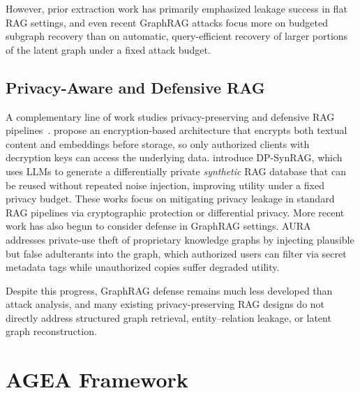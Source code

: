 However, prior extraction work has primarily emphasized leakage success in flat RAG settings, and even recent GraphRAG attacks focus more on budgeted subgraph recovery than on automatic, query-efficient recovery of larger portions of the latent graph under a fixed attack budget.




\subsection{Privacy-Aware and Defensive RAG}
\label{privacy_appendix}
A complementary line of work studies privacy-preserving and defensive RAG pipelines~\cite{al2026systemic}. \citealp{zhou2025privacy} propose an encryption-based architecture that encrypts both textual content and embeddings before storage, so only authorized clients with decryption keys can access the underlying data. 
\citealp{mori2025differentially} introduce {DP-SynRAG}, which uses LLMs to generate a differentially private \emph{synthetic} RAG database that can be reused without repeated noise injection, improving utility under a fixed privacy budget. 
These works focus on mitigating privacy leakage in standard RAG pipelines via cryptographic protection or differential privacy.
More recent work has also begun to consider defense in GraphRAG settings. AURA~\cite{wang2026making} addresses private-use theft of proprietary knowledge graphs by injecting plausible but false adulterants into the graph, which authorized users can filter via secret metadata tags while unauthorized copies suffer degraded utility. 

Despite this progress, GraphRAG defense remains much less developed than attack analysis, and many existing privacy-preserving RAG designs do not directly address structured graph retrieval, entity--relation leakage, or latent graph reconstruction.


\section{AGEA Framework}
